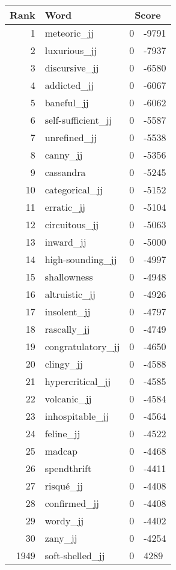 \begin{longtable}[!htbp]{| rlr@{.}l |}
    \hline
    \textbf{Rank} & \textbf{Word} & \multicolumn{2}{c|}{\textbf{Score}} \\
    \hline
    \endhead
    1 & meteoric\_jj & 0 & -9791 \\
    2 & luxurious\_jj & 0 & -7937 \\
    3 & discursive\_jj & 0 & -6580 \\
    4 & addicted\_jj & 0 & -6067 \\
    5 & baneful\_jj & 0 & -6062 \\
    6 & self-sufficient\_jj & 0 & -5587 \\
    7 & unrefined\_jj & 0 & -5538 \\
    8 & canny\_jj & 0 & -5356 \\
    9 & cassandra & 0 & -5245 \\
    10 & categorical\_jj & 0 & -5152 \\
    11 & erratic\_jj & 0 & -5104 \\
    12 & circuitous\_jj & 0 & -5063 \\
    13 & inward\_jj & 0 & -5000 \\
    14 & high-sounding\_jj & 0 & -4997 \\
    15 & shallowness & 0 & -4948 \\
    16 & altruistic\_jj & 0 & -4926 \\
    17 & insolent\_jj & 0 & -4797 \\
    18 & rascally\_jj & 0 & -4749 \\
    19 & congratulatory\_jj & 0 & -4650 \\
    20 & clingy\_jj & 0 & -4588 \\
    21 & hypercritical\_jj & 0 & -4585 \\
    22 & volcanic\_jj & 0 & -4584 \\
    23 & inhospitable\_jj & 0 & -4564 \\
    24 & feline\_jj & 0 & -4522 \\
    25 & madcap & 0 & -4468 \\
    26 & spendthrift & 0 & -4411 \\
    27 & risqué\_jj & 0 & -4408 \\
    28 & confirmed\_jj & 0 & -4408 \\
    29 & wordy\_jj & 0 & -4402 \\
    30 & zany\_jj & 0 & -4254 \\
    1949 & soft-shelled\_jj & 0 & 4289 \\

\end{longtable}
